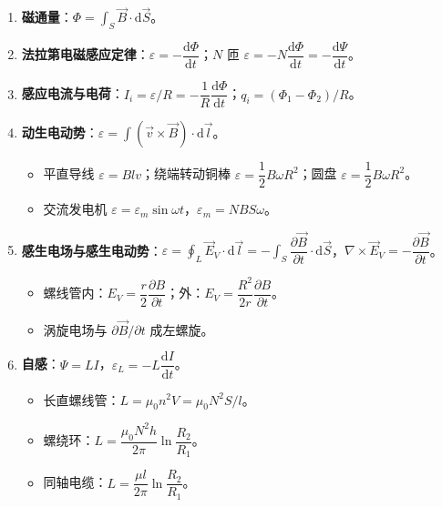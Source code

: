 \documentclass[12pt,a4paper]{ctexart}
\begin{document}
\begin{enumerate}[leftmargin=3em,label=\textbf{公式\arabic*}：,ref=公式\arabic*]

    \item \textbf{磁通量}：$\Phi=\displaystyle\int_S\vec B\cdot\mathrm d\vec S$。

    \item \textbf{法拉第电磁感应定律}：$\varepsilon=-\dfrac{\mathrm d\Phi}{\mathrm dt}$；$N$ 匝 $\varepsilon=-N\dfrac{\mathrm d\Phi}{\mathrm dt}=-\dfrac{\mathrm d\Psi}{\mathrm dt}$。

    \item \textbf{感应电流与电荷}：$I_i=\varepsilon/R=-\dfrac{1}{R}\dfrac{\mathrm d\Phi}{\mathrm dt}$；$q_i=(\Phi_1-\Phi_2)/R$。

    \item \textbf{动生电动势}：$\varepsilon=\displaystyle\int(\vec v\times\vec B)\cdot\mathrm d\vec l$。
    \begin{itemize}
        \item 平直导线 $\varepsilon=Blv$；绕端转动铜棒 $\varepsilon=\dfrac{1}{2}B\omega R^2$；圆盘 $\varepsilon=\dfrac{1}{2}B\omega R^2$。
        \item 交流发电机 $\varepsilon=\varepsilon_m\sin\omega t$，$\varepsilon_m=NBS\omega$。
    \end{itemize}

    \item \textbf{感生电场与感生电动势}：$\varepsilon=\displaystyle\oint_L\vec E_V\cdot\mathrm d\vec l=-\int_S\dfrac{\partial\vec B}{\partial t}\cdot\mathrm d\vec S$，$\nabla\times\vec E_V=-\dfrac{\partial\vec B}{\partial t}$。
    \begin{itemize}
        \item 螺线管内：$E_V=\dfrac{r}{2}\dfrac{\partial B}{\partial t}$；外：$E_V=\dfrac{R^2}{2r}\dfrac{\partial B}{\partial t}$。
        \item 涡旋电场与 $\partial\vec B/\partial t$ 成左螺旋。
    \end{itemize}

    \item \textbf{自感}：$\Psi=LI$，$\varepsilon_L=-L\dfrac{\mathrm dI}{\mathrm dt}$。
    \begin{itemize}
        \item 长直螺线管：$L=\mu_0 n^2 V=\mu_0 N^2 S/l$。
        \item 螺绕环：$L=\dfrac{\mu_0 N^2 h}{2\pi}\ln\dfrac{R_2}{R_1}$。
        \item 同轴电缆：$L=\dfrac{\mu l}{2\pi}\ln\dfrac{R_2}{R_1}$。
    \end{itemize}


\end{enumerate}
\end{document}
